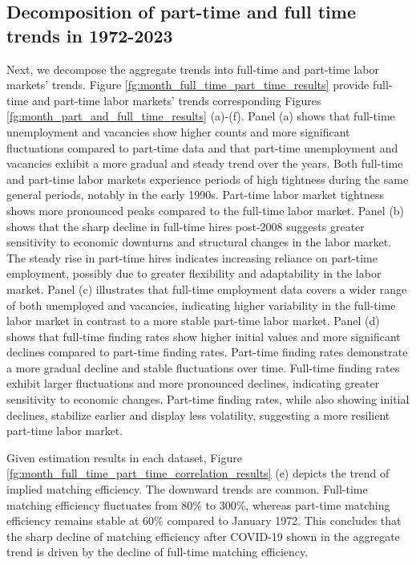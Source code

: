 \documentclass[12pt]{article}
\begin{document}
\subsection{Decomposition of part-time and full time trends in 1972-2023}
Next, we decompose the aggregate trends into full-time and part-time labor markets' trends.
Figure \ref{fg:month_full_time_part_time_results} provide full-time and part-time labor markets' trends corresponding Figures \ref{fg:month_part_and_full_time_results} (a)-(f).
Panel (a) shows that full-time unemployment and vacancies show higher counts and more significant fluctuations compared to part-time data and that part-time unemployment and vacancies exhibit a more gradual and steady trend over the years.
Both full-time and part-time labor markets experience periods of high tightness during the same general periods, notably in the early 1990s.
Part-time labor market tightness shows more pronounced peaks compared to the full-time labor market.
Panel (b) shows that the sharp decline in full-time hires post-2008 suggests greater sensitivity to economic downturns and structural changes in the labor market.
The steady rise in part-time hires indicates increasing reliance on part-time employment, possibly due to greater flexibility and adaptability in the labor market.
Panel (c) illustrates that full-time employment data covers a wider range of both unemployed and vacancies, indicating higher variability in the full-time labor market in contrast to a more stable part-time labor market.
Panel (d) shows that full-time finding rates show higher initial values and more significant declines compared to part-time finding rates.
Part-time finding rates demonstrate a more gradual decline and stable fluctuations over time.
Full-time finding rates exhibit larger fluctuations and more pronounced declines, indicating greater sensitivity to economic changes.
Part-time finding rates, while also showing initial declines, stabilize earlier and display less volatility, suggesting a more resilient part-time labor market.

Given estimation results in each dataset, Figure \ref{fg:month_full_time_part_time_correlation_results} (e) depicts the trend of implied matching efficiency.
The downward trends are common.
Full-time matching efficiency fluctuates from 80\% to 300\%, whereas part-time matching efficiency remains stable at 60\% compared to January 1972.
This concludes that the sharp decline of matching efficiency after COVID-19 shown in the aggregate trend is driven by the decline of full-time matching efficiency.
\end{document}
